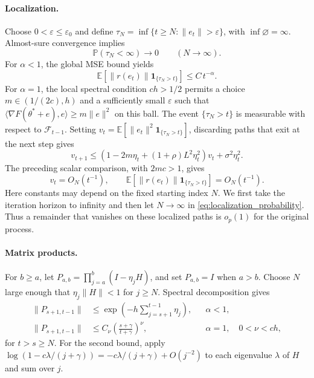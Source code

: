 \paragraph{Localization.}
Choose $0<\varepsilon\le\varepsilon_0$ and define
$\tau_N=\inf\{t\ge N:\|e_t\|>\varepsilon\}$, with
$\inf\varnothing=\infty$. Almost-sure convergence implies
\begin{equation}\label{eq:localization_probability}
\mathbb P(\tau_N<\infty)\longrightarrow0\qquad(N\to\infty).
\end{equation}
For $\alpha<1$, the global MSE bound yields
\[
\mathbb E[\|r(e_t)\|\mathbf1_{\{\tau_N>t\}}]
\le C\,t^{-\alpha}.
\]
For $\alpha=1$, the local spectral condition $ch>1/2$ permits a choice
$m\in(1/(2c),h)$ and a sufficiently small $\varepsilon$ such that
$\langle\nabla F(\theta^*+e),e\rangle\ge m\|e\|^2$
on this ball. The event $\{\tau_N>t\}$ is measurable with respect to
$\mathcal F_{t-1}$. Setting
$v_t=\mathbb E[\|e_t\|^2\mathbf1_{\{\tau_N>t\}}]$, discarding
paths that exit at the next step gives
\[
v_{t+1}\le(1-2m\eta_t+(1+\rho)L^2\eta_t^2)v_t+\sigma^2\eta_t^2.
\]
The preceding scalar comparison, with $2mc>1$, gives
\begin{equation}\label{eq:localized_remainder}
v_t=O_N(t^{-1}),\qquad
\mathbb E[\|r(e_t)\|\mathbf1_{\{\tau_N>t\}}]=O_N(t^{-1}).
\end{equation}
Here constants may depend on the fixed starting index $N$.
We first take the iteration horizon to infinity and then let $N\to\infty$
in \eqref{eq:localization_probability}. Thus a remainder that vanishes
on these localized paths is $o_p(1)$ for the original process.

\paragraph{Matrix products.}
For $b\ge a$, let $P_{a,b}=\prod_{j=a}^b(I-\eta_jH)$, and set
$P_{a,b}=I$ when $a>b$. Choose $N$ large enough that
$\eta_j\|H\|<1$ for $j\ge N$. Spectral decomposition gives
\begin{equation}\label{eq:product_bounds}
\begin{aligned}
\|P_{s+1,t-1}\|&\le
\exp\left(-h\sum_{j=s+1}^{t-1}\eta_j\right), &&\alpha<1,\\
\|P_{s+1,t-1}\|&\le C_\nu
\left(\frac{s+\gamma}{t+\gamma}\right)^\nu,
&&\alpha=1,\quad 0<\nu<ch,
\end{aligned}
\end{equation}
for $t>s\ge N$. For the second bound, apply
$\log(1-c\lambda/(j+\gamma))=-c\lambda/(j+\gamma)+O(j^{-2})$
to each eigenvalue $\lambda$ of $H$ and sum over $j$.

